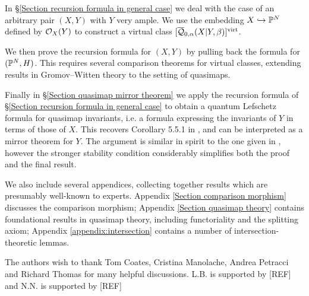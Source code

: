 In \S \ref{Section recursion formula in general case} we deal with the case of an arbitrary pair $(X,Y)$ with $Y$ very ample. We use the embedding $X \hookrightarrow \mathbb P^N$ defined by $\mathcal{O}_X(Y)$ to construct a virtual class $[\overline{\mathcal Q}_{0,\alpha}(X|Y,\beta)]^{\operatorname{virt}}$.

We then prove the recursion formula for $(X,Y)$ by pulling back the formula for $(\mathbb P^N,H)$. This requires several comparison theorems for virtual classes, extending results in Gromov--Witten theory to the setting of quasimaps.

Finally in \S \ref{Section quasimap mirror theorem} we apply the recursion formula of \S \ref{Section recursion formula in general case} to obtain a quantum Lefschetz formula for quasimap invariants, i.e. a formula expressing the invariants of $Y$ in terms of those of $X$. This recovers Corollary 5.5.1 in \cite{CF-K-wallcrossing}, and can be interpreted as a mirror theorem for $Y$. The argument is similar in spirit to the one given in \cite{Ga-MF}, however the stronger stability condition considerably simplifies both the proof and the final result.

We also include several appendices, collecting together results which are presumably well-known to experts. Appendix \ref{Section comparison morphism} discusses the comparison morphism; Appendix \ref{Section quasimap theory} contains foundational results in quasimap theory, including functoriality and the splitting axiom; Appendix \ref{appendix:intersection} contains a number of intersection-theoretic lemmas.

\begin{acknowledgements} The authors wish to thank Tom Coates, Cristina Manolache, Andrea Petracci and Richard Thomas for many helpful discussions. L.B. is supported by [REF] and N.N. is supported by [REF]
\end{acknowledgements}

